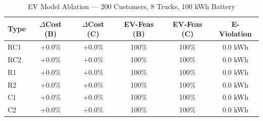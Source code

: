 \begin{table}[htbp]
\centering
\caption{EV Model Ablation — 200 Customers, 8 Trucks, 100 kWh Battery}
\label{tab:ev_ablation}
\small
\begin{tabular}{lccccc}
\toprule
Type & $\Delta$Cost (B) & $\Delta$Cost (C) & EV-Feas (B) & EV-Feas (C) & E-Violation \\
\midrule
  RC1 & +0.0\% & +0.0\% & 100\% & 100\% & 0.0 kWh \\
  RC2 & +0.0\% & +0.0\% & 100\% & 100\% & 0.0 kWh \\
  R1 & +0.0\% & +0.0\% & 100\% & 100\% & 0.0 kWh \\
  R2 & +0.0\% & +0.0\% & 100\% & 100\% & 0.0 kWh \\
  C1 & +0.0\% & +0.0\% & 100\% & 100\% & 0.0 kWh \\
  C2 & +0.0\% & +0.0\% & 100\% & 100\% & 0.0 kWh \\
\bottomrule
\end{tabular}
\end{table}